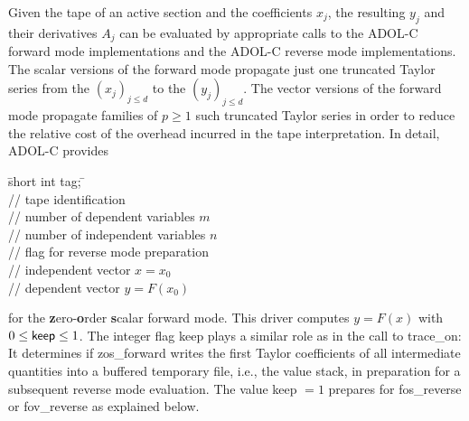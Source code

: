 \documentclass[11pt,twoside]{article}
\begin{document}
Given the tape of an active section and the coefficients $x_j$, 
the resulting $y_j$ and their derivatives $A_j$ can be evaluated
by appropriate calls to the ADOL-C forward mode implementations and
the ADOL-C reverse mode implementations. The scalar versions of the forward
mode propagate just one truncated Taylor series from the $(x_j)_{j\leq d}$
to the $(y_j)_{j\leq d}$. The vector versions of the forward
mode propagate families of $p\geq 1$ such truncated Taylor series
in order to reduce the relative cost of the overhead incurred
in the tape interpretation. In detail, ADOL-C provides 
\begin{tabbing}
\hspace{0.5in}\={\sf short int tag;} \hspace{1.1in}\= \kill    %
\\
         \> // tape identification \\
                 \> // number of  dependent variables $m$\\
                 \> // number of independent variables $n$\\
              \> // flag for reverse mode preparation\\
           \> // independent vector $x=x_0$\\
           \> // dependent vector $y=F(x_0)$
\end{tabbing}                 
for the {\bf z}ero-{\bf o}rder {\bf s}calar forward mode. This driver computes
$y=F(x)$ with $0\leq\text{\sf keep}\leq 1$. The integer
flag {\sf keep} plays a similar role as in the call to  
{\sf trace\_on}: It determines if {\sf zos\_forward} writes
the first Taylor coefficients of all intermediate quantities into a buffered
temporary file, i.e., the value stack, in preparation for a subsequent 
reverse mode evaluation. The value {\sf keep} $=1$
prepares for {\sf fos\_reverse} or {\sf fov\_reverse} as explained below.
\end{document}
